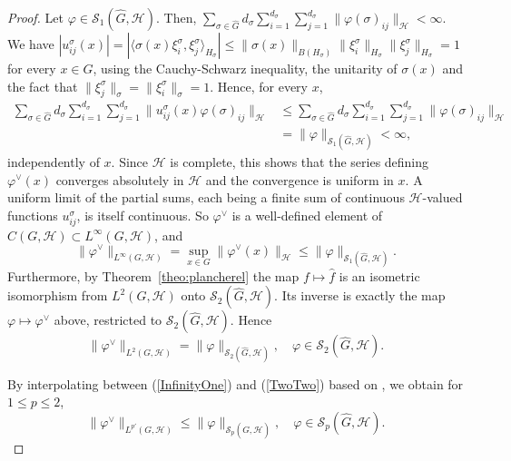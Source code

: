 \documentclass[11pt]{amsart}
\begin{document}
\begin{proof}
 Let $\varphi\in\mathscr
S_1(\widehat{G},\mathcal{H})$. Then,  $\sum\limits_{\sigma\in\widehat{G}}d_\sigma\sum\limits_{i=1}^{d_\sigma}\sum\limits_{j=1}^{d_\sigma}\|\varphi(\sigma)_{ij}\|_\mathcal{H}<\infty$.
We have   $|u^\sigma_{ij}(x)|=|\langle\sigma(x)\xi_i^\sigma,
\xi_j^\sigma\rangle_{H_\sigma}|\le\|\sigma(x)\|_{B(H_\sigma)}\|\xi_i^\sigma\|_{H_\sigma}\|\xi_j^\sigma\|_{H_\sigma}=1$
for every $x\in G$, using  the Cauchy-Schwarz inequality, the unitarity of $\sigma(x)$ and the fact that  $\|\xi_j^\sigma\|_\sigma=\|\xi_i^\sigma\|_\sigma
=1$. Hence, for every $x$,
\begin{align*}
\sum_{\sigma\in\widehat{G}}d_\sigma\sum_{i=1}^{d_\sigma}\sum_{j=1}^{d_\sigma}\big\|u^\sigma_{ij}(x)\varphi(\sigma)_{ij}\big\|_\mathcal{H}&\le
\sum_{\sigma\in\widehat{G}}d_\sigma\sum_{i=1}^{d_\sigma}\sum_{j=1}^{d_\sigma}\|\varphi(\sigma)_{ij}\|_\mathcal{H}\\
&=\|\varphi\|_{\mathscr{S}_1(\widehat{G},\mathcal{H})}
<\infty,
\end{align*}
independently of $x$. Since $\mathcal{H}$ is complete, this shows that the series defining
$\varphi^\vee(x)$ converges absolutely in $\mathcal{H}$  and the convergence is
uniform in $x$. A uniform limit of the
partial sums, each being a finite sum of continuous $\mathcal{H}$-valued functions $u^\sigma_{ij}$, is itself continuous. So $\varphi^\vee$ is a well-defined element of $C(G,\mathcal{H})\subset
L^\infty(G,\mathcal{H})$, and
\begin{equation}\label{InfinityOne}
\|\varphi^\vee\|_{L^\infty(G,\mathcal{H})}=\sup_{x\in G}\|\varphi^\vee(x)\|_\mathcal{H}\le
\|\varphi\|_{\mathscr{S}_1(\widehat{G},\mathcal{H})}.
\end{equation}
Furthermore,  by Theorem~\ref{theo:plancherel}  the
map $f\mapsto\widehat f$ is an isometric isomorphism from $L^2(G,\mathcal{H})$ onto $\mathscr{S}_2(\widehat{G},\mathcal{H})$.
Its inverse is exactly the map $\varphi\mapsto\varphi^\vee$ above, restricted to $\mathscr{S}_2(\widehat{G},\mathcal{H})$. Hence
\begin{equation}\label{TwoTwo}
\|\varphi^\vee\|_{L^2(G,\mathcal{H})}=\|\varphi\|_{\mathscr{S}_2(\widehat{G},\mathcal{H})},\quad
\varphi\in\mathscr{S}_2(\widehat{G},\mathcal{H}).
\end{equation}

 By interpolating between (\ref{InfinityOne}) and (\ref{TwoTwo}) based on  \cite[Theorem 5.1.2]{BerghLofstrom},   
we obtain for $1\le p\le 2$,
$$
\|\varphi^\vee\|_{L^{p'}(G,\mathcal{H})}\le\|\varphi\|_{\mathscr{S}_p(\widehat{G},\mathcal{H})},\quad
\varphi\in\mathscr{S}_p(\widehat{G},\mathcal{H}).
$$
\end{proof}
\end{document}
